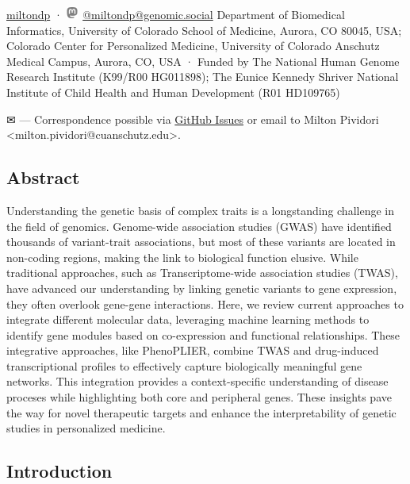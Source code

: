 \begin{itemize}
  \href{https://twitter.com/miltondp}{miltondp}
  · \includegraphics[width=0.16667in,height=0.16667in]{images/mastodon.svg}
  \href{https://genomic.social/@miltondp}{@miltondp@genomic.social}
  Department of Biomedical Informatics, University of Colorado School of Medicine, Aurora, CO 80045, USA; Colorado Center for Personalized Medicine, University of Colorado Anschutz Medical Campus, Aurora, CO, USA
  · Funded by The National Human Genome Research Institute (K99/R00 HG011898); The Eunice Kennedy Shriver National Institute of Child Health and Human Development (R01 HD109765)
\end{itemize}

\leavevmode{}%
✉ --- Correspondence possible via \href{https://github.com/pivlab/annual_review_of_biomedical_data_science/issues}{GitHub Issues}
or email to
Milton Pividori \textless milton.pividori@cuanschutz.edu\textgreater.

\hypertarget{abstract}{%
\subsection{Abstract}\label{abstract}}

Understanding the genetic basis of complex traits is a longstanding challenge in the field of genomics.
Genome-wide association studies (GWAS) have identified thousands of variant-trait associations, but most of these variants are located in non-coding regions, making the link to biological function elusive.
While traditional approaches, such as Transcriptome-wide association studies (TWAS), have advanced our understanding by linking genetic variants to gene expression, they often overlook gene-gene interactions.
Here, we review current approaches to integrate different molecular data, leveraging machine learning methods to identify gene modules based on co-expression and functional relationships.
These integrative approaches, like PhenoPLIER, combine TWAS and drug-induced transcriptional profiles to effectively capture biologically meaningful gene networks.
This integration provides a context-specific understanding of disease proceses while highlighting both core and peripheral genes.
These insights pave the way for novel therapeutic targets and enhance the interpretability of genetic studies in personalized medicine.

\hypertarget{introduction}{%
\subsection{Introduction}\label{introduction}}

